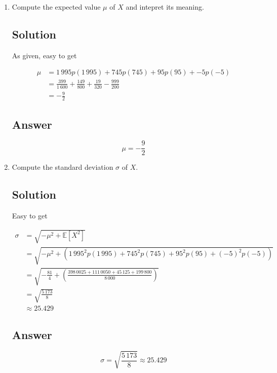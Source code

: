 \documentclass[12pt]{article}
\newcommand{\bE}{\mathbb{E}}
\begin{document}
\begin{enumerate}[start=1,label={\bfseries Part \arabic*:},leftmargin=0in]
		\bigskip\item Compute the expected value $\mu$ of $X$ and intepret its meaning.
		
		\subsection*{Solution}
			
			As given, easy to get
			
			\[
				\begin{aligned}
					\mu &= 1\,995p(1\,995) + 745p(745) + 95p(95) + -5p(-5)\\
					&= \frac{399}{1\,600} + \frac{149}{800} + \frac{19}{320} - \frac{999}{200}\\
					&= -\frac{9}{2}
				\end{aligned}
			\]
		
		\subsection*{Answer}
		
			\[\boxed{\mu = -\frac{9}{2}}\]
			
		\bigskip\item Compute the standard deviation $\sigma$ of $X$.
		
		\subsection*{Solution}
		
			Easy to get
		
			\[
				\begin{aligned}
					\sigma &= \sqrt{-\mu^2 + \bE\left[X^2\right]}\\
					&= \sqrt{-\mu^2 + \left(1\,995^2p(1\,995) + 745^2p(745) + 95^2p(95) + (-5)^2p(-5)\right)}\\
					&= \sqrt{-\frac{81}{4} + \left(\frac{398\,0025 + 111\,0050 + 45\,125 + 199\,800}{8\,000}\right)}\\
					&= \sqrt{\frac{5\,173}{8}}\\
					&\approx 25.429
				\end{aligned}
			\]
		
		\subsection*{Answer}
		
			\[\boxed{\sigma = \sqrt{\frac{5\,173}{8}} \approx 25.429}\]
	\end{enumerate}
	
\end{document}
